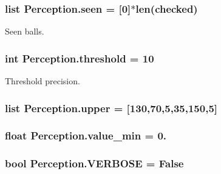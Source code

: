 \subsubsection[{\texorpdfstring{seen}{seen}}]{\setlength{\rightskip}{0pt plus 5cm}list Perception.\+seen = \mbox{[}0\mbox{]}$\ast$len({\bf checked})}\hypertarget{namespacePerception_a2df199890febf0c129179eacf940dbaa}{}\label{namespacePerception_a2df199890febf0c129179eacf940dbaa}


Seen balls. 

\subsubsection[{\texorpdfstring{threshold}{threshold}}]{\setlength{\rightskip}{0pt plus 5cm}int Perception.\+threshold = 10}\hypertarget{namespacePerception_a9f6f9cf6f9b5895bb39924b3682a262b}{}\label{namespacePerception_a9f6f9cf6f9b5895bb39924b3682a262b}


Threshold precision. 

\subsubsection[{\texorpdfstring{upper}{upper}}]{\setlength{\rightskip}{0pt plus 5cm}list Perception.\+upper = \mbox{[}130,70,5,35,150,5\mbox{]}}\hypertarget{namespacePerception_a0d76072dc5634b931abcd5275677b670}{}\label{namespacePerception_a0d76072dc5634b931abcd5275677b670}
\subsubsection[{\texorpdfstring{value\+\_\+min}{value_min}}]{\setlength{\rightskip}{0pt plus 5cm}float Perception.\+value\+\_\+min = 0.}\hypertarget{namespacePerception_ac133c0d0f793260fe4d078d02ec777b6}{}\label{namespacePerception_ac133c0d0f793260fe4d078d02ec777b6}
\subsubsection[{\texorpdfstring{V\+E\+R\+B\+O\+SE}{VERBOSE}}]{\setlength{\rightskip}{0pt plus 5cm}bool Perception.\+V\+E\+R\+B\+O\+SE = False}\hypertarget{namespacePerception_a45c9a255f6f96422822a1134c6200451}{}\label{namespacePerception_a45c9a255f6f96422822a1134c6200451}
